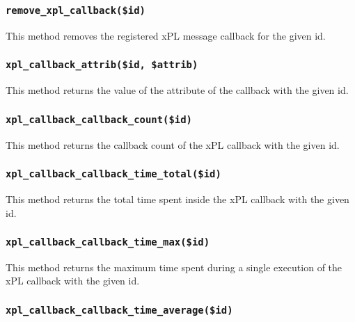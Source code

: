 \subsubsection*{\texttt{remove\_xpl\_callback(\$id)}\label{xPL::Listener_remove_xpl_callback_id_}}


This method removes the registered xPL message callback for the given
id.

\subsubsection*{\texttt{xpl\_callback\_attrib(\$id, \$attrib)}\label{xPL::Listener_xpl_callback_attrib_id_attrib_}}


This method returns the value of the attribute of the callback with
the given id.

\subsubsection*{\texttt{xpl\_callback\_callback\_count(\$id)}\label{xPL::Listener_xpl_callback_callback_count_id_}}


This method returns the callback count of the xPL callback with
the given id.

\subsubsection*{\texttt{xpl\_callback\_callback\_time\_total(\$id)}\label{xPL::Listener_xpl_callback_callback_time_total_id_}}


This method returns the total time spent inside the xPL callback with
the given id.

\subsubsection*{\texttt{xpl\_callback\_callback\_time\_max(\$id)}\label{xPL::Listener_xpl_callback_callback_time_max_id_}}


This method returns the maximum time spent during a single execution
of the xPL callback with the given id.

\subsubsection*{\texttt{xpl\_callback\_callback\_time\_average(\$id)}\label{xPL::Listener_xpl_callback_callback_time_average_id_}}


